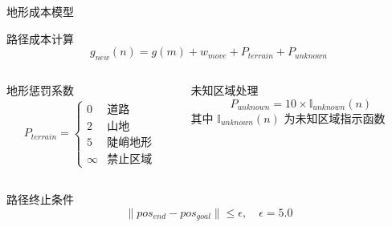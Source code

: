 \documentclass[
10pt,
aspectratio=169,
]{beamer}
\begin{document}
\begin{frame}{地形成本模型}
    \begin{block}{路径成本计算}
        \begin{equation}
            g_{new}(n) = g(m) + w_{move} + P_{terrain} + P_{unknown}
        \end{equation}
    \end{block}
    
    \begin{columns}
        \begin{column}{0.5\textwidth}
            \begin{exampleblock}{地形惩罚系数}
                \begin{align}
                    P_{terrain} = \begin{cases}
                    0 & \text{道路} \\
                    2 & \text{山地} \\
                    5 & \text{陡峭地形} \\
                    \infty & \text{禁止区域}
                    \end{cases}
                \end{align}
            \end{exampleblock}
        \end{column}
        \begin{column}{0.5\textwidth}
            \begin{alertblock}{未知区域处理}
                \begin{equation}
                    P_{unknown} = 10 \times \mathbb{I}_{unknown}(n)
                \end{equation}
                其中 $\mathbb{I}_{unknown}(n)$ 为未知区域指示函数
            \end{alertblock}
        \end{column}
    \end{columns}
    
    \begin{exampleblock}{路径终止条件}
        \begin{equation}
            \|pos_{end} - pos_{goal}\| \leq \epsilon, \quad \epsilon = 5.0
        \end{equation}
    \end{exampleblock}
\end{frame}
\end{document}
